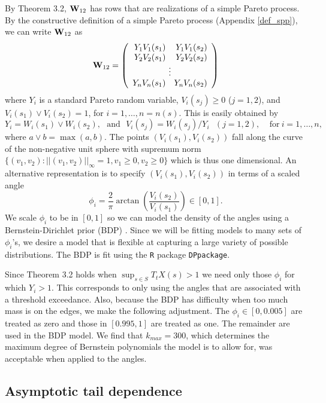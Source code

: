 By Theorem 3.2, $\mathbf{\bm{W}}_{12}$ has rows that are realizations of a simple Pareto process. By the constructive definition of a simple Pareto process (Appendix \ref{def_spp}), we can write $\mathbf{\bm{W}}_{12}$ as
\[ \m{W}_{12} = \left(\begin{array}{rr} Y_1V_1(s_1) & Y_1V_1(s_2) \\ Y_2V_2(s_1) & Y_2V_2(s_2) \\ \multicolumn{2}{c}{\vdots} \\ Y_nV_n(s_1) & Y_nV_n(s_2) \end{array}\right) \]
where $Y_i$ is a standard Pareto random variable, $V_i(s_j)\geq 0$ ($j=1,2$), and $V_i(s_1) \vee V_i(s_2) = 1$, for $i=1,\ldots,n=n(s)$. This is easily obtained by
\[ Y_i = W_i(s_1) \vee W_i(s_2),~~~\mathrm{and}~~~ V_i(s_j) = W_i(s_j) / Y_i ~~~ (j=1,2),~~~~~\mathrm{for~}i=1,\ldots,n, \]
where $a \vee b=\max(a,b)$. The points $(V_i(s_1), V_i(s_2))$ fall along the curve of the non-negative unit sphere with supremum norm $\{(v_1, v_2):||(v_1,v_2)||_\infty=1, v_1\geq0,v_2\geq0\}$ which is thus one dimensional. An alternative representation is to specify $(V_i(s_1), V_i(s_2))$ in terms of a scaled angle
\[ \phi_i = \frac{2}{\pi}\arctan\left(\frac{V_i(s_2)}{V_i(s_1)}\right)\in[0,1]. \]
We scale $\phi_i$ to be in $[0,1]$ so we can model the density of the angles using a Bernstein-Dirichlet prior (BDP) \citep{petrone1999bayesian}. Since we will be fitting models to many sets of $\phi_i$'s, we desire a model that is flexible at capturing a large variety of possible distributions. The BDP is fit using the \texttt{R} package \texttt{DPpackage}.

Since Theorem 3.2 holds when $\sup_{s\in S}T_t X(s) > 1$ we need only those $\phi_i$ for which $Y_i>1$. This corresponds to only using the angles that are associated with a threshold exceedance. Also, because the BDP has difficulty when too much mass is on the edges, we make the following adjustment. The $\phi_i\in[0, 0.005]$ are treated as zero and those in $[0.995, 1]$ are treated as one. The remainder are used in the BDP model. We find that $k_{max}=300$, which determines the maximum degree of Bernstein polynomials the model is to allow for, was acceptable when applied to the angles.



\subsection{Asymptotic tail dependence}
\label{asy_tail}

